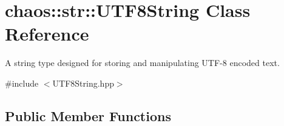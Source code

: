 \hypertarget{classchaos_1_1str_1_1_u_t_f8_string}{}\section{chaos\+:\+:str\+:\+:U\+T\+F8\+String Class Reference}
\label{classchaos_1_1str_1_1_u_t_f8_string}


A string type designed for storing and manipulating U\+T\+F-\/8 encoded text.  




{\ttfamily \#include $<$U\+T\+F8\+String.\+hpp$>$}

\subsection*{Public Member Functions}

